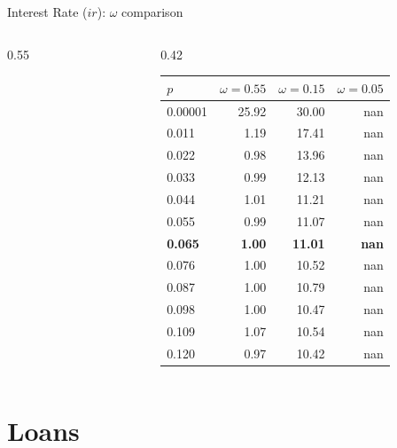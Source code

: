 \documentclass[aspectratio=169,10pt]{beamer}
\begin{document}
\begin{frame}{Interest Rate ($ir$): $\omega$ comparison}
\begin{columns}[T]
\begin{column}{0.55\textwidth}
\begin{figure}
      \end{figure}
    \end{column}
    \begin{column}{0.42\textwidth}
      \footnotesize\renewcommand{\arraystretch}{0.85}\setlength{\tabcolsep}{3pt}
      \begin{tabular}{lrrr}
        \toprule
        $p$ & $\omega=0.55$ & $\omega=0.15$ & $\omega=0.05$ \\
        \midrule
        0.00001 & 25.92 & 30.00 & nan \\
        0.011 & 1.19 & 17.41 & nan \\
        0.022 & 0.98 & 13.96 & nan \\
        0.033 & 0.99 & 12.13 & nan \\
        0.044 & 1.01 & 11.21 & nan \\
        0.055 & 0.99 & 11.07 & nan \\
        \textbf{0.065} & \textbf{1.00} & \textbf{11.01} & \textbf{nan} \\
        0.076 & 1.00 & 10.52 & nan \\
        0.087 & 1.00 & 10.79 & nan \\
        0.098 & 1.00 & 10.47 & nan \\
        0.109 & 1.07 & 10.54 & nan \\
        0.120 & 0.97 & 10.42 & nan \\
        \bottomrule
      \end{tabular}
    \end{column}
  \end{columns}
\end{frame}

\section{Loans}
\end{document}
